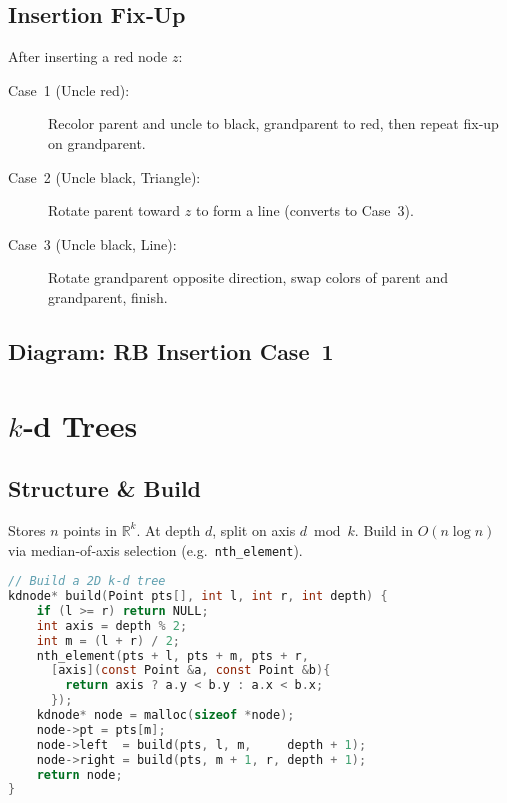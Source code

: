 \documentclass[12pt]{article}
\begin{document}
\subsection*{Insertion Fix‑Up}
After inserting a red node \(z\):
\begin{description}
  \item[Case 1 (Uncle red):] Recolor parent and uncle to black, grandparent to red, then repeat fix‑up on grandparent.
  \item[Case 2 (Uncle black, Triangle):] Rotate parent toward \(z\) to form a line (converts to Case 3).
  \item[Case 3 (Uncle black, Line):] Rotate grandparent opposite direction, swap colors of parent and grandparent, finish.
\end{description}

\subsection*{Diagram: RB Insertion Case 1}
\begin{center}
\end{center}

\newpage
\section{$k$‑d Trees}
\subsection*{Structure \& Build}
Stores \(n\) points in \(\mathbb{R}^k\).  At depth \(d\), split on axis \(d \bmod k\).  Build in \(O(n\log n)\) via median‑of‑axis selection (e.g.\ \texttt{nth\_element}).

\begin{lstlisting}[language=C]
// Build a 2D k-d tree
kdnode* build(Point pts[], int l, int r, int depth) {
    if (l >= r) return NULL;
    int axis = depth % 2;
    int m = (l + r) / 2;
    nth_element(pts + l, pts + m, pts + r,
      [axis](const Point &a, const Point &b){
        return axis ? a.y < b.y : a.x < b.x;
      });
    kdnode* node = malloc(sizeof *node);
    node->pt = pts[m];
    node->left  = build(pts, l, m,     depth + 1);
    node->right = build(pts, m + 1, r, depth + 1);
    return node;
}
\end{lstlisting}
\end{document}

